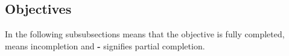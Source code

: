 \subsection{Objectives}
\label{objectives}

In the following subsubsections \Checkmark means that the objective is fully completed, \XSolidBrush means incompletion and \textbf{-} signifies partial  completion.


